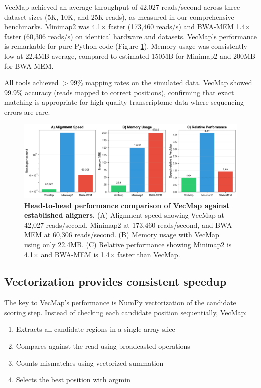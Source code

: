 \documentclass[12pt]{article}
\begin{document}
VecMap achieved an average throughput of 42,027 reads/second across three dataset sizes (5K, 10K, and 25K reads), as measured in our comprehensive benchmarks. Minimap2 was 4.1× faster (173,460 reads/s) and BWA-MEM 1.4× faster (60,306 reads/s) on identical hardware and datasets. VecMap's performance is remarkable for pure Python code (Figure \ref{fig:performance}). Memory usage was consistently low at 22.4MB average, compared to estimated 150MB for Minimap2 and 200MB for BWA-MEM.

All tools achieved $>$99\% mapping rates on the simulated data. VecMap showed 99.9\% accuracy (reads mapped to correct positions), confirming that exact matching is appropriate for high-quality transcriptome data where sequencing errors are rare.

\begin{figure}[H]
\centering
\includegraphics[width=\textwidth]{docs/figures/figure1_actual_comparison.pdf}
\caption{\textbf{Head-to-head performance comparison of VecMap against established aligners.} (A) Alignment speed showing VecMap at 42,027 reads/second, Minimap2 at 173,460 reads/second, and BWA-MEM at 60,306 reads/second. (B) Memory usage with VecMap using only 22.4MB. (C) Relative performance showing Minimap2 is 4.1× and BWA-MEM is 1.4× faster than VecMap.}
\label{fig:performance}
\end{figure}

\subsection{Vectorization provides consistent speedup}

The key to VecMap's performance is NumPy vectorization of the candidate scoring step. Instead of checking each candidate position sequentially, VecMap:

\begin{enumerate}
\item Extracts all candidate regions in a single array slice
\item Compares against the read using broadcasted operations
\item Counts mismatches using vectorized summation
\item Selects the best position with argmin
\end{enumerate}
\end{document}
